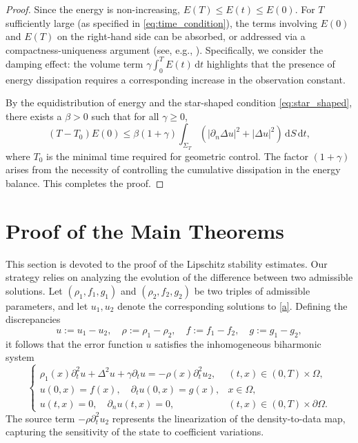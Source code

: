 \documentclass[12pt,reqno]{amsart}
\numberwithin{equation}{section}
\begin{document}
\begin{proof}
		Since the energy is non-increasing, $E(T) \le E(t) \le E(0)$. For $T$ sufficiently large (as specified in \eqref{eq:time_condition}), the terms involving $E(0)$ and $E(T)$ on the right-hand side can be absorbed, or addressed via a compactness-uniqueness argument (see, e.g., \cite{Lions1988Controllability}). Specifically, we consider the damping effect: the volume term $\gamma \int_0^T E(t) \, \mathrm{d}t$ highlights that the presence of energy dissipation requires a corresponding increase in the observation constant. 
		
		By the equidistribution of energy and the star-shaped condition \eqref{eq:star_shaped}, there exists a $\beta > 0$ such that for all $\gamma \ge 0$,
		\begin{equation}\label{eq:final_reduction}
			(T - T_0) E(0) \leq \beta (1 + \gamma) \int_{\Sigma_T} \left( \left| \partial_n \Delta u \right|^2 + |\Delta u|^2 \right) \, \mathrm{d}S \, \mathrm{d}t,
		\end{equation}
		where $T_0$ is the minimal time required for geometric control. The factor $(1+\gamma)$ arises from the necessity of controlling the cumulative dissipation in the energy balance. This completes the proof.
	\end{proof}
	
	
	
	
	\section{Proof of the Main Theorems}\label{sec4}
	
	This section is devoted to the proof of the Lipschitz stability estimates. Our strategy relies on analyzing the evolution of the difference between two admissible solutions. Let $(\rho_1, f_1, g_1)$ and $(\rho_2, f_2, g_2)$ be two triples of admissible parameters, and let $u_1, u_2$ denote the corresponding solutions to \eqref{a}. Defining the discrepancies
	\[ u := u_1 - u_2, \quad \rho := \rho_1 - \rho_2, \quad f := f_1 - f_2, \quad g := g_1 - g_2, \]
	it follows that the error function $u$ satisfies the inhomogeneous biharmonic system
	\begin{equation}\label{eq:non_homogeneous_system}
		\begin{cases}
			\rho_1(x)\partial_t^2 u + \Delta^2 u + \gamma\partial_t u = -\rho(x)\partial_t^2 u_2, & (t, x) \in (0, T) \times \Omega, \\
			u(0, x) = f(x), \quad \partial_t u(0, x) = g(x), & x \in \Omega, \\
			u(t, x) = 0, \quad \partial_n u(t, x) = 0, & (t, x) \in (0, T) \times \partial\Omega.
		\end{cases}
	\end{equation}
	The source term $-\rho\partial_t^2 u_2$ represents the linearization of the density-to-data map, capturing the sensitivity of the state to coefficient variations.
	
\end{document}
